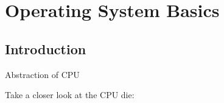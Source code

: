 \section{Operating System Basics}
\subsection{Introduction}

\begin{frame}[fragile]{Abstraction of CPU}

	Take a closer look at the CPU die:



\end{frame}
